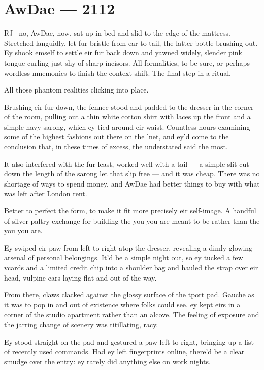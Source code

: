 \hypertarget{rj-brewster-2112}{%
\chapter*{AwDae — 2112}\label{rj-brewster-2112}}

RJ-- no, AwDae, now, sat up in bed and slid to the edge of the mattress. Stretched languidly, let fur bristle from ear to tail, the latter bottle-brushing out. Ey shook emself to settle eir fur back down and yawned widely, slender pink tongue curling just shy of sharp incisors. All formalities, to be sure, or perhaps wordless mnemonics to finish the context-shift. The final step in a ritual.

All those phantom realities clicking into place.

Brushing eir fur down, the fennec stood and padded to the dresser in the corner of the room, pulling out a thin white cotton shirt with laces up the front and a simple navy sarong, which ey tied around eir waist. Countless hours examining some of the highest fashions out there on the 'net, and ey'd come to the conclusion that, in these times of excess, the understated said the most.

It also interfered with the fur least, worked well with a tail — a simple slit cut down the length of the sarong let that slip free — and it was cheap. There was no shortage of ways to spend money, and AwDae had better things to buy with what was left after London rent.

Better to perfect the form, to make it fit more precisely eir self-image. A handful of silver paltry exchange for building the you you are meant to be rather than the you you are.

Ey swiped eir paw from left to right atop the dresser, revealing a dimly glowing arsenal of personal belongings. It'd be a simple night out, so ey tucked a few vcards and a limited credit chip into a shoulder bag and hauled the strap over eir head, vulpine ears laying flat and out of the way.

From there, claws clacked against the glossy surface of the tport pad. Gauche as it was to pop in and out of existence where folks could see, ey kept eirs in a corner of the studio apartment rather than an alcove. The feeling of exposure and the jarring change of scenery was titillating, racy.

Ey stood straight on the pad and gestured a paw left to right, bringing up a list of recently used commands. Had ey left fingerprints online, there'd be a clear smudge over the entry: ey rarely did anything else on work nights.

